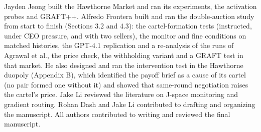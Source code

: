 \documentclass[11pt,letterpaper]{article}
\newcommand{\head}[1]{\par\vspace{26pt}{\noindent\fontsize{14}{17}\selectfont\bfseries\color[HTML]{434343}#1\par}\nopagebreak\vspace{6pt}\nopagebreak}
\newenvironment{instr}{\par\itshape\setlength{\parindent}{0pt}\raggedright}{\par}
\begin{document}
\head{Author Contributions}
\begin{instr}
Jayden Jeong built the Hawthorne Market and ran its experiments, the activation probes and GRAFT++. Alfredo Frontera built and ran the double-auction study from start to finish (Sections 3.2 and 4.3): the cartel-formation tests (instructed, under CEO pressure, and with two sellers), the monitor and fine conditions on matched histories, the GPT-4.1 replication and a re-analysis of the runs of Agrawal et al., the price check, the withholding variant and a GRAFT test in that market. He also designed and ran the intervention test in the Hawthorne duopoly (Appendix B), which identified the payoff brief as a cause of its cartel (no pair formed one without it) and showed that same-round negotiation raises the cartel's price. Jake Li reviewed the literature on J-space monitoring and gradient routing. Rohan Dash and Jake Li contributed to drafting and organizing the manuscript. All authors contributed to writing and reviewed the final manuscript. 
\end{instr}
\end{document}
